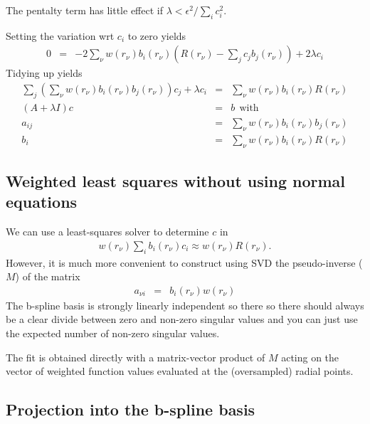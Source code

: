 \documentclass[12pt]{article}
\begin{document}
The pentalty term has little effect if $\lambda < \epsilon^2 / \sum_i c_i^2$. 

Setting the variation wrt $c_i$ to zero yields
\begin{eqnarray}
  0 & = & - 2 \sum_\nu  w(r_\nu) b_i(r_\nu) \left( R(r_\nu) - \sum_j c_j b_j(r_\nu) \right) + 2\lambda c_i
\end{eqnarray}
Tidying up yields
\begin{eqnarray}
  \sum_j \left( \sum_\nu w(r_\nu) b_i(r_\nu) b_j(r_\nu) \right) c_j + \lambda c_i & = & \sum_\nu  w(r_\nu) b_i(r_\nu)  R(r_\nu) \\
  \left( A + \lambda I \right) c & = & b ~ ~\mbox{with} \\
  a_{ij} & = & \sum_\nu w(r_\nu) b_i(r_\nu) b_j(r_\nu) \\
  b_i & = & \sum_\nu  w(r_\nu)  b_i(r_\nu) R(r_\nu) 
\end{eqnarray}

\subsection{Weighted least squares without using normal equations}

We can use a least-squares solver to determine $c$ in
\begin{eqnarray}
  w(r_\nu) \sum_i b_i(r_\nu) c_i \approx w(r_\nu) R(r_\nu).
\end{eqnarray}
However, it is much more convenient to construct using SVD the pseudo-inverse ($M$) of the matrix
\begin{eqnarray}
 a_{\nu i} & = & b_i(r_\nu) w(r_\nu) 
\end{eqnarray}
The b-spline basis is strongly linearly independent so there so there should always be a clear divide between zero and non-zero singular values and you can just use the expected number of non-zero singular values.

The fit is obtained directly with a matrix-vector product of $M$ acting on the vector of weighted function values evaluated at the (oversampled) radial points.

\subsection{Projection into the b-spline basis}
\end{document}
